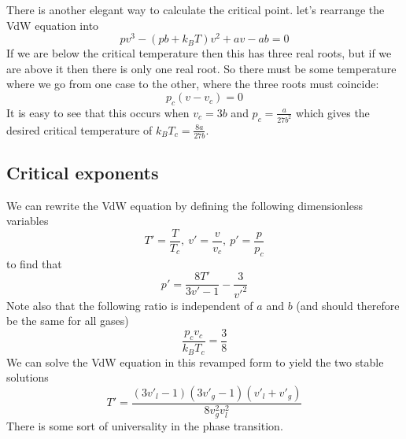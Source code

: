 \documentclass[a4paper,11pt,oneside]{book}
\begin{document}
There is another elegant way to calculate the critical point. let's rearrange the VdW equation into
\begin{equation}
    pv^3 - (pb+k_BT)v^2+av-ab=0
\end{equation}
If we are below the critical temperature then this has three real roots, but if we are above it then there is only one real root. So there must be some temperature where we go from one case to the other, where the three roots must coincide:
\begin{equation}
    p_c(v-v_c)=0
\end{equation}
It is easy to see that this occurs when $v_c=3b$ and $p_c = \frac{a}{27b^2}$ which gives the desired critical temperature of $k_BT_c = \frac{8a}{27b}$.
\subsection*{Critical exponents}
We can rewrite the VdW equation by defining the following dimensionless variables
\begin{equation}
    T' = \frac{T}{T_c}, \ v' = \frac{v}{v_c}, \ p' = \frac{p}{p_c}
\end{equation}
to find that
\begin{equation}
    p'=\frac{8T'}{3v'-1}-\frac{3}{v'^2}
\end{equation}
Note also that the following ratio is independent of $a$ and $b$ (and should therefore be the same for all gases)
\begin{equation}
    \frac{p_cv_c}{k_BT_c} = \frac{3}{8}
\end{equation}
We can solve the VdW equation in this revamped form to yield the two stable solutions
\begin{equation}\label{VdW 2}
    T' = \frac{(3v'_l-1)(3v'_g-1)(v'_l+v'_g)}{8v_g^2v_l^2}
\end{equation}
There is some sort of universality in the phase transition.
\end{document}
